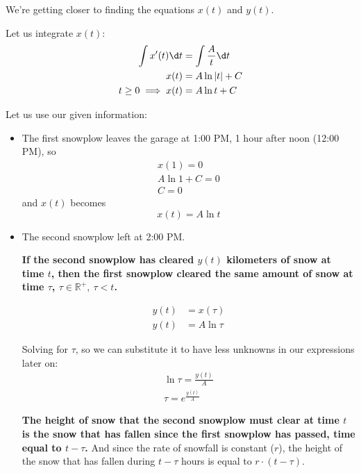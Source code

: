 \documentclass[a4paper,12pt]{article}
\begin{document}
        We're getting closer to finding the equations $x(t)$ and $y(t)$.

        \hfill \break
        Let us integrate $x(t)$:
        \begin{align*}
            \int x'(t) \d t &= \int{\frac{A}{t}} \d t \\
            x(t) &= A \ln |t|+C \\
            t \geq 0 \implies x(t) &= A \ln t + C
        \end{align*}
        
        Let us use our given information:
        \begin{itemize}
            \item The first snowplow leaves the garage at 1:00 PM, 1 hour after noon (12:00 PM), so
                \begin{gather*}
                    x(1) = 0 \\
                    A \ln 1 +C = 0 \\
                    C = 0
                \end{gather*}
                and $x(t)$ becomes
                \begin{equation}
                    x(t) = A \ln t
                    \label{eq:x(t)}
                \end{equation}

            \item The second snowplow left at 2:00 PM.

            \textbf{If the second snowplow has cleared $y(t)$ kilometers of snow at time $t$, then the first snowplow cleared the same amount of snow at time $\tau$, $\tau \in \mathbb{R^+}, \ \tau < t$.}

            \begin{align*}
                y(t) &= x(\tau) \\
                y(t) &= A \ln \tau
            \end{align*}

            Solving for $\tau$, so we can substitute it to have less unknowns in our expressions later on:
            \begin{gather*}
                \ln \tau = \frac{y(t)}{A} \\
                \tau = e^{\frac{y(t)}{A}}
            \end{gather*}

            \textbf{The height of snow that the second snowplow must clear at time $t$ is the snow that has fallen since the first snowplow has passed, time equal to $t - \tau$.} And since the rate of snowfall is constant ($r$), the height of the snow that has fallen during \(t-\tau\) hours is equal to \(r \cdot (t - \tau)\).


\end{itemize}
\end{document}
